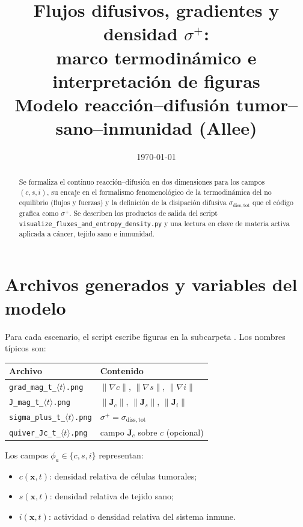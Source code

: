 \documentclass[11pt,a4paper]{article}
\title{Flujos difusivos, gradientes y densidad $\sigma^{+}$:\\
marco termodinámico e interpretación de figuras\\
\large Modelo reacción--difusión tumor--sano--inmunidad (Allee)}
\author{}
\date{\today}
\newcommand{\vect}[1]{\mathbf{#1}}
\begin{document}
\maketitle

\begin{abstract}
Se formaliza el continuo reacción--difusión en dos dimensiones para los campos
$(c,s,i)$, su encaje en el formalismo fenomenológico de la termodinámica del no
equilibrio (flujos y fuerzas) y la definición de la disipación difusiva
$\sigma_{\mathrm{diss,tot}}$ que el código grafica como $\sigma^{+}$.
Se describen los productos de salida del script
\texttt{visualize\_fluxes\_and\_entropy\_density.py} y una lectura en clave de
materia activa aplicada a cáncer, tejido sano e inmunidad.
\end{abstract}

\tableofcontents
\newpage

\section{Archivos generados y variables del modelo}

Para cada escenario, el script 
escribe figuras en la subcarpeta . Los nombres
típicos son:
\begin{center}
\begin{tabular}{@{}ll@{}}
\toprule
Archivo & Contenido \\
\midrule
\texttt{grad\_mag\_t\_$\langle t\rangle$.png} &
$\lVert\nabla c\rVert$, $\lVert\nabla s\rVert$, $\lVert\nabla i\rVert$ \\
\texttt{J\_mag\_t\_$\langle t\rangle$.png} &
$\lVert \vect{J}_c\rVert$, $\lVert \vect{J}_s\rVert$, $\lVert \vect{J}_i\rVert$ \\
\texttt{sigma\_plus\_t\_$\langle t\rangle$.png} &
$\sigma^{+}=\sigma_{\mathrm{diss,tot}}$ \\
\texttt{quiver\_Jc\_t\_$\langle t\rangle$.png} &
campo $\vect{J}_c$ sobre $c$ (opcional) \\
\bottomrule
\end{tabular}
\end{center}

Los campos $\phi_a\in\{c,s,i\}$ representan:
\begin{itemize}
  \item $c(\vect{x},t)$: densidad relativa de células tumorales;
  \item $s(\vect{x},t)$: densidad relativa de tejido sano;
  \item $i(\vect{x},t)$: actividad o densidad relativa del sistema inmune.
\end{itemize}
\end{document}
